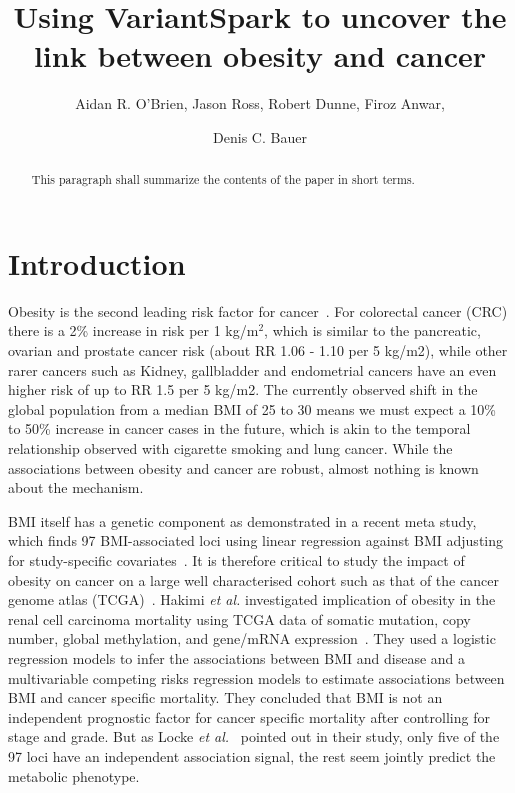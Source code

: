 \documentclass{llncs}
\begin{document}
\setcounter{save}{\value{section}}
{\def\addtocontents#1#2{}%
\def\addcontentsline#1#2#3{}%
\def\markboth#1#2{}%
%
\title{Using VariantSpark to uncover the link between obesity and cancer}

\author{Aidan R. O'Brien, Jason Ross, Robert Dunne, Firoz Anwar, \and Denis C. Bauer}


\maketitle
%
\begin{abstract}
This paragraph shall summarize the contents of the paper
in short terms.
\end{abstract}
%
\section{Introduction}
%

Obesity is the second leading risk factor for cancer~\cite{DePergola2013}. 
For colorectal cancer (CRC) there is a 2\% increase in risk per 1 kg/m$^2$, which is similar to the pancreatic, ovarian and prostate cancer risk (about RR 1.06 - 1.10 per 5 kg/m2), while other rarer cancers such as Kidney, gallbladder and endometrial cancers have an even higher risk of up to RR 1.5 per 5 kg/m2. 
The currently observed shift in the global population from a median BMI of 25 to 30 means we must expect a 10\% to 50\% increase in cancer cases in the future, which is akin to the temporal relationship observed with cigarette smoking and lung cancer. 
While the associations between obesity and cancer are robust, almost nothing is known about the mechanism.

BMI itself has a genetic component as demonstrated in a recent meta study, which finds 97 BMI-associated loci using linear regression against BMI adjusting for study-specific covariates~\cite{Locke2015}. 
It is therefore critical to study the impact of obesity on cancer on a large well characterised cohort such as that of the cancer genome atlas (TCGA)~\cite{1KG2012}. 
Hakimi {\it et al.} investigated implication of obesity in the renal cell carcinoma mortality using TCGA data of somatic mutation, copy number, global methylation, and gene/mRNA expression~\cite{DePergola2013}. 
They used a logistic regression models to infer the associations between BMI and disease and a multivariable competing risks regression models to estimate associations between BMI and cancer specific mortality. 
They concluded that BMI is not an independent prognostic factor for cancer specific mortality after controlling for stage and grade. 
But as Locke {\it et al.}~\cite{Locke2015} pointed out in their study, only five of the 97 loci have an independent association signal, the rest seem jointly predict the metabolic phenotype.

}
\end{document}
